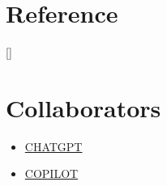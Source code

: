 \section{Reference}
[\refname]{}
\renewcommand*{\bibfont}{\large}
\nocite{*}  
\printbibliography
\section{Collaborators}
\begin{itemize}
    \item \href{https://chatgpt.com/}{CHATGPT}
    \item \href{https://github.com/features/copilot}{COPILOT}
\end{itemize}